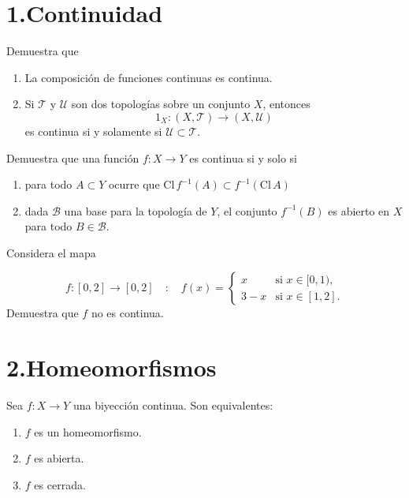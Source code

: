 \documentclass[b5paper,10pt,twoside]{book}
\begin{document}
\def\thetitle{Tarea 02}
\def\fechaentrega{26 de enero de 2025}



\section*{1.\enspace Continuidad }

\begin{problem}
Demuestra que 
\begin{enumerate}[label=(\roman*)]
    \item La composición de funciones continuas es continua. 
    \item Si \(\mathcal{T}\) y \(\mathcal{U}\) son dos topologías sobre un conjunto \(X\), entonces 
        \[1_X \colon (X,\mathcal{T}) \to (X,\mathcal{U})\]
    es continua si y solamente si \(\mathcal{U}\subset \mathcal{T}\).
\end{enumerate}
\end{problem}

\begin{problem}
Demuestra que una función \(f\colon X\to Y\)
es continua si y solo si 
\begin{enumerate}[label=(\roman*)]
    \item para todo \(A\subset Y\) ocurre que \(\text{Cl}\,  f^{-1}(A)\subset f^{-1}(\text{Cl} \, A)\)
    \item dada \(\mathcal{B}\)  una base para la topología de \(Y\), el conjunto \(f^{-1}(B)\) es abierto en \(X\) para todo \(B\in \mathcal{B}\).
\end{enumerate}
\end{problem}

\begin{problem}
Considera el mapa 

\[
f : [0, 2] \to [0, 2] \quad:\quad f(x) = 
\begin{cases} 
x & \text{si } x \in [0, 1), \\ 
3 - x & \text{si } x \in [1, 2].
\end{cases}
\]
Demuestra que \(f\) no es continua.
\end{problem}


\section*{2.\enspace Homeomorfismos}


\begin{problem}
Sea \( f: X \to Y \) una biyección continua. Son equivalentes:
\begin{enumerate}[label=(\roman*)]
    \item \( f \) es un homeomorfismo.
    \item \( f \) es abierta.
    \item \( f \) es cerrada.
\end{enumerate}


\end{problem}
\end{document}
